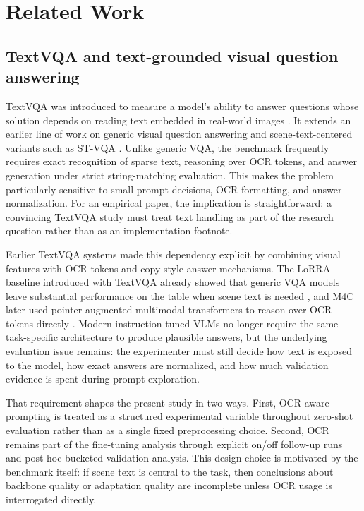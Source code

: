 \section{Related Work}
\label{sec:related}

\subsection{TextVQA and text-grounded visual question answering}

TextVQA was introduced to measure a model's ability to answer questions whose solution depends on reading text embedded in real-world images \citep{singh2019textvqa}. It extends an earlier line of work on generic visual question answering \citep{antol2015vqa} and scene-text-centered variants such as ST-VQA \citep{biten2019stvqa}. Unlike generic VQA, the benchmark frequently requires exact recognition of sparse text, reasoning over OCR tokens, and answer generation under strict string-matching evaluation. This makes the problem particularly sensitive to small prompt decisions, OCR formatting, and answer normalization. For an empirical paper, the implication is straightforward: a convincing TextVQA study must treat text handling as part of the research question rather than as an implementation footnote.

Earlier TextVQA systems made this dependency explicit by combining visual features with OCR tokens and copy-style answer mechanisms. The LoRRA baseline introduced with TextVQA already showed that generic VQA models leave substantial performance on the table when scene text is needed \citep{singh2019textvqa}, and M4C later used pointer-augmented multimodal transformers to reason over OCR tokens directly \citep{hu2020m4c}. Modern instruction-tuned VLMs no longer require the same task-specific architecture to produce plausible answers, but the underlying evaluation issue remains: the experimenter must still decide how text is exposed to the model, how exact answers are normalized, and how much validation evidence is spent during prompt exploration.

That requirement shapes the present study in two ways. First, OCR-aware prompting is treated as a structured experimental variable throughout zero-shot evaluation rather than as a single fixed preprocessing choice. Second, OCR remains part of the fine-tuning analysis through explicit on/off follow-up runs and post-hoc bucketed validation analysis. This design choice is motivated by the benchmark itself: if scene text is central to the task, then conclusions about backbone quality or adaptation quality are incomplete unless OCR usage is interrogated directly.

